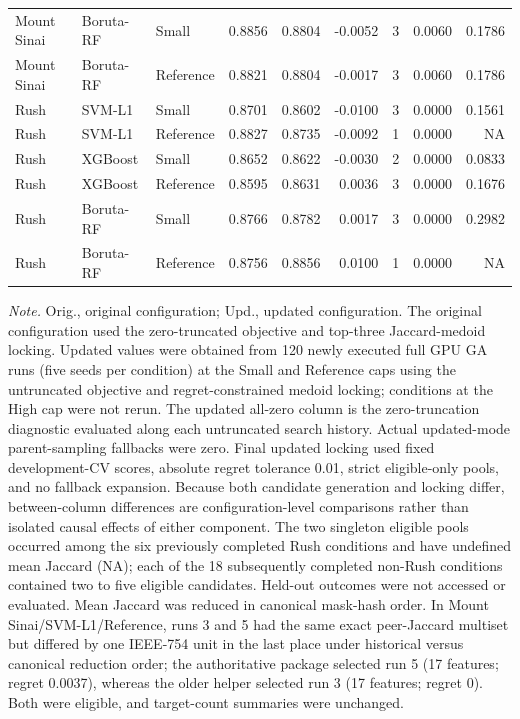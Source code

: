 \begin{table}[p]
{\begin{tabular}{lllrrrrrr}
Mount Sinai & Boruta-RF & Small & 0.8856 & 0.8804 & -0.0052 & 3 & 0.0060 & 0.1786 \\
Mount Sinai & Boruta-RF & Reference & 0.8821 & 0.8804 & -0.0017 & 3 & 0.0060 & 0.1786 \\
\addlinespace[2pt]
Rush & SVM-L1 & Small & 0.8701 & 0.8602 & -0.0100 & 3 & 0.0000 & 0.1561 \\
Rush & SVM-L1 & Reference & 0.8827 & 0.8735 & -0.0092 & 1 & 0.0000 & NA \\
Rush & XGBoost & Small & 0.8652 & 0.8622 & -0.0030 & 2 & 0.0000 & 0.0833 \\
Rush & XGBoost & Reference & 0.8595 & 0.8631 & 0.0036 & 3 & 0.0000 & 0.1676 \\
Rush & Boruta-RF & Small & 0.8766 & 0.8782 & 0.0017 & 3 & 0.0000 & 0.2982 \\
Rush & Boruta-RF & Reference & 0.8756 & 0.8856 & 0.0100 & 1 & 0.0000 & NA \\
\bottomrule
\end{tabular}}
\vspace{0.55em}
\parbox{0.98\linewidth}{\scriptsize\textit{Note.} Orig., original configuration; Upd., updated configuration. The original configuration used the zero-truncated objective and top-three Jaccard-medoid locking. Updated values were obtained from 120 newly executed full GPU GA runs (five seeds per condition) at the Small and Reference caps using the untruncated objective and regret-constrained medoid locking; conditions at the High cap were not rerun. The updated all-zero column is the zero-truncation diagnostic evaluated along each untruncated search history. Actual updated-mode parent-sampling fallbacks were zero. Final updated locking used fixed development-CV scores, absolute regret tolerance 0.01, strict eligible-only pools, and no fallback expansion. Because both candidate generation and locking differ, between-column differences are configuration-level comparisons rather than isolated causal effects of either component. The two singleton eligible pools occurred among the six previously completed Rush conditions and have undefined mean Jaccard (NA); each of the 18 subsequently completed non-Rush conditions contained two to five eligible candidates. Held-out outcomes were not accessed or evaluated. Mean Jaccard was reduced in canonical mask-hash order. In Mount Sinai/SVM-L1/Reference, runs 3 and 5 had the same exact peer-Jaccard multiset but differed by one IEEE-754 unit in the last place under historical versus canonical reduction order; the authoritative package selected run 5 (17 features; regret 0.0037), whereas the older helper selected run 3 (17 features; regret 0). Both were eligible, and target-count summaries were unchanged.}
\end{table}
